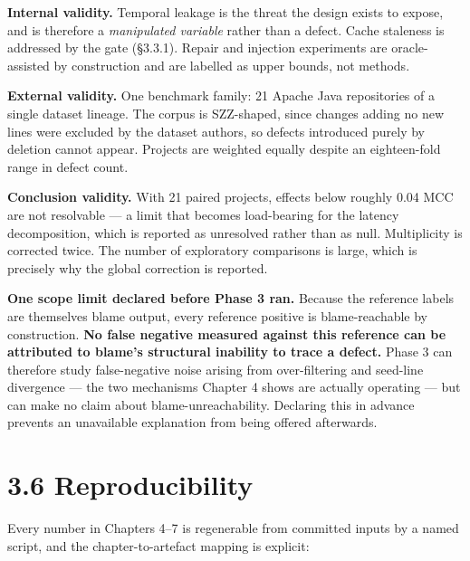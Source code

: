 \textbf{Internal validity.} Temporal leakage is the threat the design
exists to expose, and is therefore a \emph{manipulated variable} rather
than a defect. Cache staleness is addressed by the gate (\S{}3.3.1). Repair
and injection experiments are oracle-assisted by construction and are
labelled as upper bounds, not methods.

\textbf{External validity.} One benchmark family: 21 Apache Java
repositories of a single dataset lineage. The corpus is SZZ-shaped,
since changes adding no new lines were excluded by the dataset authors,
so defects introduced purely by deletion cannot appear. Projects are
weighted equally despite an eighteen-fold range in defect count.

\textbf{Conclusion validity.} With 21 paired projects, effects below
roughly 0.04 MCC are not resolvable --- a limit that becomes
load-bearing for the latency decomposition, which is reported as
unresolved rather than as null. Multiplicity is corrected twice. The
number of exploratory comparisons is large, which is precisely why the
global correction is reported.

\textbf{One scope limit declared before Phase 3 ran.} Because the
reference labels are themselves blame output, every reference positive
is blame-reachable by construction. \textbf{No false negative measured
against this reference can be attributed to blame's structural inability
to trace a defect.} Phase 3 can therefore study false-negative noise
arising from over-filtering and seed-line divergence --- the two
mechanisms Chapter 4 shows are actually operating --- but can make no
claim about blame-unreachability. Declaring this in advance prevents an
unavailable explanation from being offered afterwards.

\section{3.6 Reproducibility}\label{reproducibility}

Every number in Chapters 4--7 is regenerable from committed inputs by a
named script, and the chapter-to-artefact mapping is explicit:

